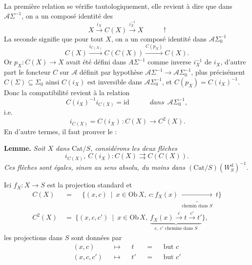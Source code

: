 \documentclass[11pt]{article}
\newcommand{\printedpage}[1]{\marginpar{\footnotesize p.~#1}}
\newcommand{\msp}[1]{\marginpar{\footnotesize [#1]}}
\newcommand{\Cat}{\mathrm{Cat}}
\newcommand{\Ob}{\mathrm{Ob}}
\newcommand{\id}{\mathrm{id}}
\newcommand{\cA}{\mathcal{A}}
\begin{document}
\msp{page 68}
La première relation se vérifie tautologiquement, elle revient à dire que dans $\cA\Sigma^{-1}$, on a un composé identité des
\[
X\xrightarrow{i_X}C(X)\xrightarrow{i_X^{-1}}X\qquad\quad!
\]
La seconde signifie que pour tout $X$, on a un composé identité dans $\cA\Sigma_0^{-1}$
\[
C(X)\xrightarrow{i_{C(X)}}C(C(X))\xrightarrow{C(p_X)}C(X).
\]
Or $p_X:C(X)\longrightarrow X$ avait été défini dans $A\Sigma^{-1}$ comme inverse $i_X^{-1}$ de $i_X$, d'autre part le foncteur $C$ sur $\cA$ définit par hypothèse $\cA\Sigma^{-1}\longrightarrow\cA\Sigma_0^{-1}$, plus précisément $C(\Sigma)\subseteq\Sigma_0$ %
\printedpage{42}
ainsi $C(i_X)$ est inversible dans $\cA\Sigma_0^{-1}$, et $C(p_X)=C(i_X)^{-1}$. Donc la compatibilité revient à la relation
\[
C(i_X)^{-1}i_{C(X)}=\id\qquad\quad\textit{dans}\ \ \cA\Sigma_0^{-1},
\]
i.e.
\[
\boxed{\,i_{C(X)}=C(i_X)\,}:C(X)\longrightarrow C^2(X).
\]
En d'autre termes, il faut prouver le : %

\textbf{Lemme.} \textit{Soit $X$ dans $\Cat/S$, considérons les deux flèches}
\[
i_{C(X)},\ C(i_X):C(X)\rightrightarrows C(C(X)).
\]
\textit{Ces flèches sont égales, sinon au sens absolu, du moins dans $(\Cat/S)(W_S^{\mathrm{d}})^{-1}$.}

Ici $f_X:X\longrightarrow S$ est la projection standard et
\[
\begin{aligned}
C(X)\ &=\ \quad\{(x,c)\ \mid\ x\in\Ob\,X,\ c:f_X(x)\ \underbrace{\longrightarrow}_{\text{chemin dans }S}\ t\}\\
C^2(X)\ &=\ \{(x,c,c')\ \mid\ x\in\Ob\,X,\ \underbrace{f_X(x)\xrightarrow{c}t\xrightarrow{c'}t'}_{c,\ c'\text{ chemins dans }S}\},
\end{aligned}
\]
les projections dans $S$ sont données par
\[
\begin{aligned}
(x,c)&&\longmapsto&&t&&=&&\text{but }c\\
(x,c,c')&&\longmapsto&&t'&&=&&\text{but }c'
\end{aligned}
\]
\end{document}
